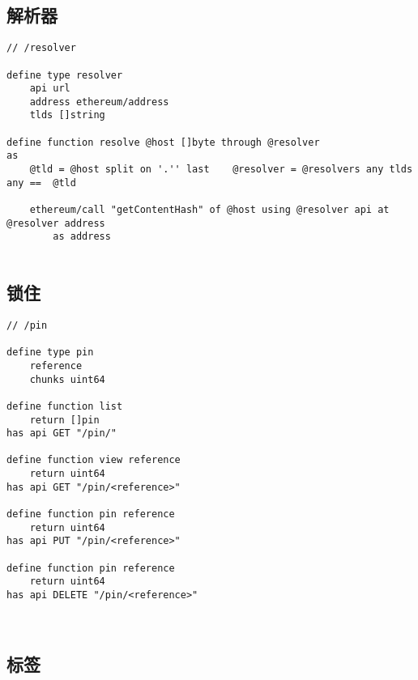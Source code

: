 \subsection{解析器}\label{spec:format:resolver}


\begin{definition}[Resolver]\label{def:resolver}
\begin{lstlisting}[language=buzz1]
// /resolver

define type resolver 
    api url
    address ethereum/address
    tlds []string 

define function resolve @host []byte through @resolver
as
    @tld = @host split on '.'' last    @resolver = @resolvers any tlds any ==  @tld
        
    ethereum/call "getContentHash" of @host using @resolver api at @resolver address
        as address
                     
\end{lstlisting}
\end{definition}




\subsection{锁住}\label{spec:format:pinning}


\begin{definition}[Pinning]\label{def:pinning}
\begin{lstlisting}[language=buzz1]
// /pin

define type pin
    reference
    chunks uint64
    
define function list
    return []pin
has api GET "/pin/"

define function view reference
    return uint64
has api GET "/pin/<reference>"
    
define function pin reference
    return uint64
has api PUT "/pin/<reference>"

define function pin reference
    return uint64
has api DELETE "/pin/<reference>"
    
       
\end{lstlisting}
\end{definition}



\subsection{标签}\label{spec:format:tags}


